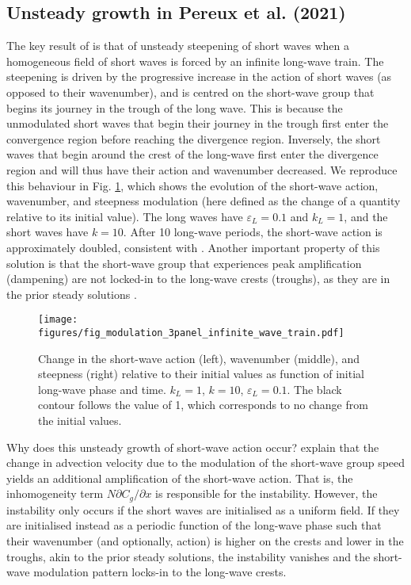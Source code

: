 \documentclass[lineno]{jfm}
\begin{document}
\subsection{Unsteady growth in Pereux et al. (2021)}
\label{subsection:unsteady_growth}

The key result of \citet{peureux2021unsteady} is that of unsteady steepening of
short waves when a homogeneous field of short waves is forced by an infinite
long-wave train.
The steepening is driven by the progressive increase in the action of short
waves (as opposed to their wavenumber), and is centred on the short-wave group
that begins its journey in the trough of the long wave.
This is because the unmodulated short waves that begin their journey in the
trough first enter the convergence region before reaching the divergence region.
Inversely, the short waves that begin around the crest of the long-wave first
enter the divergence region and will thus have their action and wavenumber
decreased.
We reproduce this behaviour in Fig. \ref{fig:modulation_3panel_infinite}, which
shows the evolution of the short-wave action, wavenumber, and steepness
modulation (here defined as the change of a quantity relative to its initial value).
The long waves have $\varepsilon_L = 0.1$ and $k_L = 1$, and the short waves
have $k = 10$.
After 10 long-wave periods, the short-wave action is approximately doubled,
consistent with \citet{peureux2021unsteady}.
Another important property of this solution is that the short-wave group that
experiences peak amplification (dampening) are not locked-in to the long-wave
crests (troughs), as they are in the prior steady solutions
\citep{longuet1960changes,longuet1987propagation,zhang1990evolution}.

\begin{figure}
\centering
\texttt{[image: figures/fig\_modulation\_3panel\_infinite\_wave\_train.pdf]}
\caption{
  Change in the short-wave action (left), wavenumber (middle), and steepness (right)
  relative to their initial values as function of initial long-wave phase and time.
  $k_L = 1$, $k = 10$, $\varepsilon_L = 0.1$.
  The black contour follows the value of 1, which corresponds to no change
  from the initial values.
}
\label{fig:modulation_3panel_infinite}
\end{figure}

Why does this unsteady growth of short-wave action occur?
\citet{peureux2021unsteady} explain that the change in advection velocity due to
the modulation of the short-wave group speed yields an additional amplification
of the short-wave action.
That is, the inhomogeneity term $N \partial C_g / \partial x$ is
responsible for the instability.
However, the instability only occurs if the short waves are initialised as a
uniform field.
If they are initialised instead as a periodic function of the long-wave phase
such that their wavenumber (and optionally, action) is higher on the crests
and lower in the troughs, akin to the prior steady solutions, the instability
vanishes and the short-wave modulation pattern locks-in to the long-wave
crests.
\end{document}

